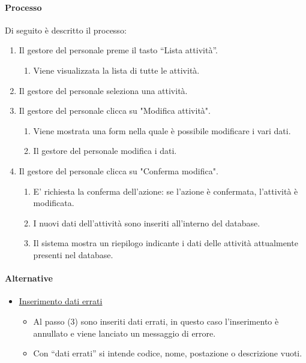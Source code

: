 \paragraph{Processo}
Di seguito è descritto il processo:
\begin{enumerate}
	\item Il gestore del personale preme il tasto “Lista attività”.
		\begin{enumerate}
			\item Viene visualizzata la lista di tutte le attività.
		\end{enumerate}
	\item Il gestore del personale seleziona una attività. 
	\item Il gestore del personale clicca su "Modifica attività".
		\begin{enumerate}
			\item Viene mostrata una form nella quale è possibile modificare i vari dati.
			\item Il gestore del personale modifica i dati.
		\end{enumerate}
	\item Il gestore del personale clicca su "Conferma modifica".
		\begin{enumerate}
			\item E' richiesta la conferma dell’azione: se l’azione è confermata, l'attività è modificata.
			\item I nuovi dati dell'attività sono inseriti all’interno del database.
			\item Il sistema mostra un riepilogo indicante i dati delle attività attualmente presenti nel database.
		\end{enumerate}
\end{enumerate}
\paragraph{Alternative}
\begin{itemize}
	\item \underline{Inserimento dati errati}
		\begin{itemize}
			\item Al passo (3) sono inseriti dati errati, in questo caso l’inserimento è annullato e viene lanciato un messaggio di errore. 
			\item Con “dati errati” si intende codice, nome, postazione o descrizione vuoti.
		\end{itemize}
\end{itemize}
